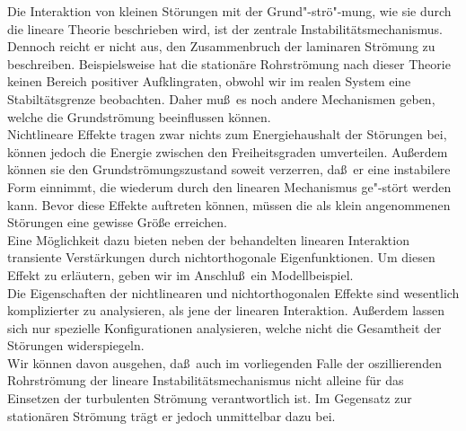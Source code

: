 \documentclass[10pt,a5paper,oneside,draft]{book}
\numberwithin{equation}{chapter}
\begin{document}
Die Interaktion von kleinen St\"orungen mit der Grund"-str\"o"-mung, wie sie durch die lineare Theorie beschrieben wird, ist der zentrale Instabilit\"atsmechanismus.
Dennoch reicht er nicht aus, den Zusammenbruch der laminaren Str\"omung zu beschreiben.
Beispielsweise hat die station\"are Rohrstr\"omung nach dieser Theorie keinen Bereich positiver Aufklingraten, obwohl wir im realen System eine Stabilt\"atsgrenze beobachten.
Daher mu\ss\ es noch andere Mechanismen geben, welche die Grundstr\"omung beeinflussen k\"onnen.\\
Nichtlineare Effekte tragen zwar nichts zum Energiehaushalt der St\"orungen bei, k\"onnen jedoch die Energie zwischen den Freiheitsgraden umverteilen.
Au\ss erdem k\"onnen sie den Grundstr\"omungszustand soweit verzerren, da\ss\ er eine instabilere Form einnimmt, die wiederum durch den linearen Mechanismus ge"-st\"ort werden kann.
Bevor diese Effekte auftreten k\"onnen, m\"ussen die als klein angenommenen St\"orungen eine gewisse Gr\"o\ss e erreichen.\\
Eine M\"oglichkeit dazu bieten neben der behandelten linearen Interaktion transiente Verst\"arkungen durch nichtorthogonale Eigenfunktionen.
Um diesen Effekt zu erl\"autern, geben wir im Anschlu\ss\ ein Modellbeispiel.\\
Die Eigenschaften der nichtlinearen und nichtorthogonalen Effekte sind wesentlich komplizierter zu analysieren, als jene der linearen Interaktion.
Au\ss erdem lassen sich nur spezielle Konfigurationen analysieren, welche nicht die Gesamtheit der St\"orungen widerspiegeln.\\
Wir k\"onnen davon ausgehen, da\ss\ auch im vorliegenden Falle der oszillierenden Rohrstr\"omung der lineare Instabilit\"atsmechanismus nicht alleine f\"ur das Einsetzen der turbulenten Str\"omung verantwortlich ist.
Im Gegensatz zur station\"aren Str\"omung tr\"agt er jedoch unmittelbar dazu bei.\\
\end{document}
